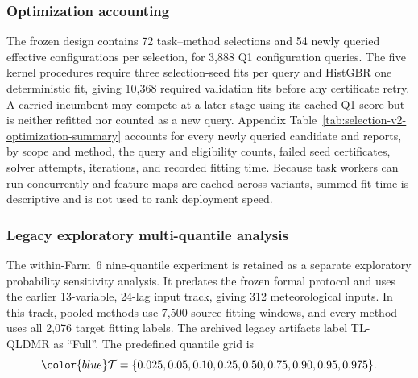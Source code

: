\subsubsection{Optimization accounting}
{\color{blue}The frozen design contains 72 task--method selections and 54 newly queried effective configurations per selection, for 3,888 Q1 configuration queries. The five kernel procedures require three selection-seed fits per query and HistGBR one deterministic fit, giving 10,368 required validation fits before any certificate retry. A carried incumbent may compete at a later stage using its cached Q1 score but is neither refitted nor counted as a new query. Appendix Table~\ref{tab:selection-v2-optimization-summary} accounts for every newly queried candidate and reports, by scope and method, the query and eligibility counts, failed seed certificates, solver attempts, iterations, and recorded fitting time. Because task workers can run concurrently and feature maps are cached across variants, summed fit time is descriptive and is not used to rank deployment speed.}


\subsubsection{Legacy exploratory multi-quantile analysis}
{\color{blue}The within-Farm~6 nine-quantile experiment is retained as a separate exploratory probability sensitivity analysis. It predates the frozen formal protocol and uses the earlier 13-variable, 24-lag input track, giving 312 meteorological inputs. In this track, pooled methods use 7,500 source fitting windows, and every method uses all 2,076 target fitting labels. The archived legacy artifacts label TL-QLDMR as ``Full''. The predefined quantile grid is}
\begin{equation*}
{\color{blue}\mathcal{T}=\{0.025,0.05,0.10,0.25,0.50,0.75,0.90,0.95,0.975\}.}
\end{equation*}

